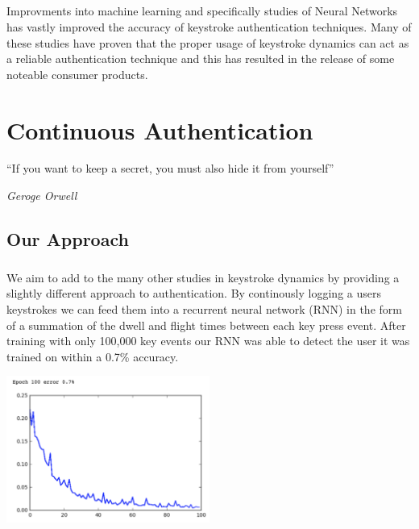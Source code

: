 \documentclass[fancychapters]{report}
\begin{document}
\paragraph{}Improvments into machine learning and specifically studies of Neural Networks has vastly improved the accuracy of keystroke authentication techniques.   
Many of these studies have proven that the proper usage of keystroke dynamics can act as a reliable authentication technique \cite{KEYSTROKE7} and this has resulted in the release of some noteable consumer products. \cite{PROD1} \cite{PROD2} \cite{PROD3}

\chapter{Continuous Authentication}
\epigraph{``If you want to keep a secret, you must also hide it from yourself''}{ \textit{Geroge Orwell}}
\section{Our Approach}
\paragraph{}We aim to add to the many other studies in keystroke dynamics by providing a slightly different approach to authentication.
By continously logging a users keystrokes we can feed them into a recurrent neural network (RNN) in the form of a summation of the dwell and flight times between each key press event.
After training with only 100,000 key events our RNN was able to detect the user it was trained on within a 0.7\% accuracy. 

\begin{center}
\includegraphics[width=0.5\textwidth]{graph1}
\end{center}
\end{document}
